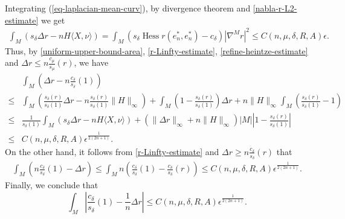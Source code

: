 \documentclass{amsart}
\numberwithin{equation}{section}
\theoremstyle{remark}
\renewcommand{\(}{\left(}
\renewcommand{\)}{\right)}
\renewcommand{\~}{\tilde}
\renewcommand{\-}{\overline}
\renewcommand{\d}{\delta}
\newcommand{\e}{\epsilon}
\newcommand{\D}{\Delta}
\begin{document}
Integrating (\ref{eq-laplacian-mean-curv}), by divergence theorem and \eqref{nabla-r-L2-estimate} we get
\begin{align}\label{refine-heintze-estimate}
\int_M (s_\d \D r-n H \langle X,\nu\rangle)=\int_M (s_\d \operatorname{Hess}r(e_n^\ast,e_n^\ast)-c_\d)|\nabla^M r|^2\leq C(n,\mu,\d,R,A) \e.
\end{align}
Thus, by \eqref{uniform-upper-bound-area}, \eqref{r-Linfty-estimate}, \eqref{refine-heintze-estimate} and $\D r \le n\frac{c_\mu}{s_\mu}(r)$, we have
\begin{align*}
     &\int_{M} \(\D r-n\frac{c_\d}{s_\d}(1)\) \\ 
\leq &\int_{M} \(\frac{s_\d(r)}{s_\d(1)}\D r-n\frac{s_\d(r)}{s_\d(1)}\|H\|_\infty\)+\int_{M} \(1-\frac{s_\d(r)}{s_\d(1)}\)\D r +n\|H\|_\infty \int_{M} \(\frac{s_\d(r)}{s_\d(1)}-1\)\\ 
\leq &\frac{1}{s_\d(1)}\int_{M} \(s_\d \D r-nH \langle X,\nu\rangle\)+\(\|\D r\|_\infty +n\|H\|_\infty\)|M| \left|1-\frac{s_\d(r)}{s_\d(1)}\right| \\
\leq &C(n,\mu,\d,R,A) \e^\frac{1}{2(2n+1)}.
\end{align*}
On the other hand, it follows from \eqref{r-Linfty-estimate} and $\D r \ge n\frac{c_\d}{s_\d}(r)$ that 
\begin{align*}
\int_{M} \(n\frac{c_\d}{s_\d}(1)-\D r\)  \leq \int_{M} n\(\frac{c_\d}{s_\d}(1)-\frac{c_\d}{s_\d}(r)\) \leq C(n,\mu,\d,R,A) \e^\frac{1}{2(2n+1)}.
\end{align*}
Finally, we conclude that
\begin{equation}\label{deviation-laplace}
\int_{M} \left|\frac{c_\d}{s_\d}(1)-\frac{1}{n}\Delta r \right| \leq C(n,\mu,\d,R,A)\e^\frac{1}{2(2n+1)}.
\end{equation}
\end{document}
